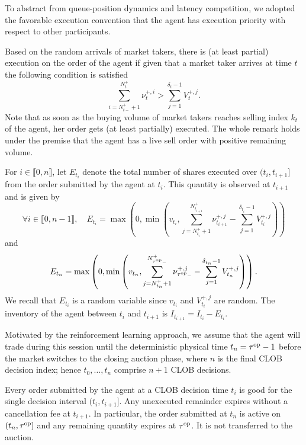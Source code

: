 \documentclass[11pt]{article}
\begin{document}
To abstract from queue-position dynamics and latency competition, we adopted the favorable execution convention that the agent has execution priority with respect to other participants.

\begin{remark}
Based on the random arrivals of market takers, there is (at least partial) execution on the order of the agent if given that a market taker arrives at time $t$ the following condition is satisfied  
\[
   \sum_{i=N_{t-}^++1}^{N_t^+}\nu_t^{+,i} > \sum_{j =1}^{\delta_t-1} V_{t}^{+,j}.
\]
Note that as soon as the buying volume of market takers reaches selling index $k_t$ of the agent, her order gets (at least partially) executed. The whole remark holds under the premise that the agent has a live sell order with positive remaining volume.
\end{remark}

For $i\in\llbracket0,n\rrbracket$, let $E_{t_i}$ denote the total number of shares executed over $(t_i,t_{i+1}]$ from the order submitted by the agent at $t_i$. This quantity is observed at $t_{i+1}$ and is given by
\[\forall i \in \llbracket 0,n-1 \rrbracket, \quad E_{t_i} = \max\left(0, \min\left(v_{t_i}, \sum_{j=N_{t_i}^++1}^{N_{t_{i+1}}^+}\nu_{t_{i+1}}^{+,j}- \sum_{j=1}^{{\delta_{t_i}-1}} V_{t_i}^{+,j}\right)\right)\]
and
\[E_{t_n} = \max\left(0, \min\left(v_{t_n}, \sum_{j=N_{t_n}^++1}^{N_{{\tau^{\mathrm{op}}}_-}^+}\nu_{{\tau^{\mathrm{op}}}_-}^{+,j}- \sum_{j=1}^{{\delta_{t_n}-1}} V_{t_n}^{+,j}\right)\right).\]
We recall that $E_{t_i}$ is a random variable since $v_{t_i}$ and $V_{t_i}^{+,j}$ are random. The inventory of the agent between $t_i$ and $t_{i+1}$ is $I_{t_{i+1}} = I_{t_i}-E_{t_i}$.\vspace{0.5em}

Motivated by the reinforcement learning approach, we assume that the agent will trade during this session until the deterministic physical time $t_n={\tau^{\mathrm{op}}}-1$ before the market switches to the closing auction phase, where $n$ is the final CLOB decision index; hence $t_0,\ldots,t_n$ comprise $n+1$ CLOB decisions.\vspace{0.5em}

Every order submitted by the agent at a CLOB decision time $t_i$ is good for the single decision interval $(t_i,t_{i+1}]$. Any unexecuted remainder expires without a cancellation fee at $t_{i+1}$. In particular, the order submitted at $t_n$ is active on $(t_n,\tau^{\mathrm{op}}]$ and any remaining quantity expires at $\tau^{\mathrm{op}}$. It is not transferred to the auction.
\end{document}
